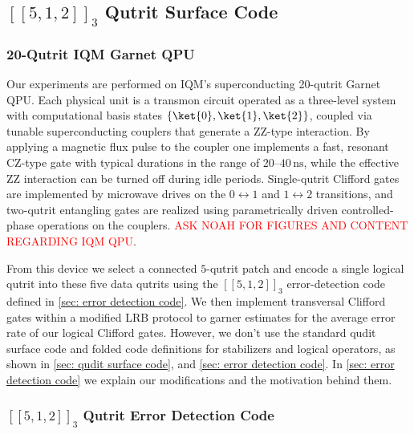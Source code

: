 \subsection{$[[5,1,2]]_3$ Qutrit Surface Code}

\subsubsection{20-Qutrit IQM Garnet QPU}

Our experiments are performed on IQM's superconducting 20-qutrit Garnet QPU.  Each physical unit is a transmon circuit operated as a three-level system with computational basis states $\{\ket{0},\ket{1},\ket{2}\}$, coupled via tunable superconducting couplers that generate a ZZ-type interaction.  By applying a magnetic
flux pulse to the coupler one implements a fast, resonant CZ-type gate with typical durations in the range of $20$--$40\,\mathrm{ns}$, while
the effective ZZ interaction can be turned off during idle periods. Single-qutrit Clifford gates are implemented by microwave drives on the
$0\!\leftrightarrow\!1$ and $1\!\leftrightarrow\!2$ transitions, and two-qutrit entangling gates are realized using parametrically driven controlled-phase operations on the couplers. \textcolor{red}{ASK NOAH FOR FIGURES AND CONTENT REGARDING IQM QPU}.

From this device we select a connected $5$-qutrit patch and encode a single logical qutrit into these five data qutrits using the $[[5,1,2]]_3$ error-detection code defined in \autoref{sec: error detection code}. We then implement transversal Clifford gates within a modified LRB protocol to garner estimates for the average error rate of our logical Clifford gates. However, we don't use the standard qudit surface code and folded code definitions for stabilizers and logical operators, as shown in \autoref{sec: qudit surface code}, \cite{Moussa2016} and \autoref{sec: error detection code}. In \autoref{sec: error detection code} we explain our modifications and the motivation behind them. 


\subsubsection{$[[5,1,2]]_3$ Qutrit Error Detection Code} \label{sec: error detection code}

